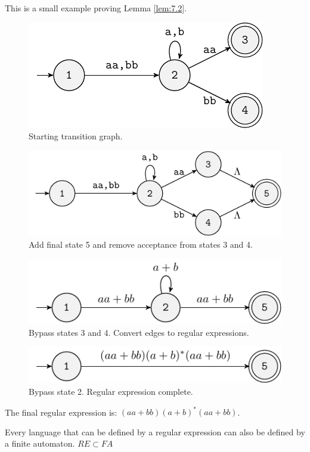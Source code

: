\newpage
\begin{example}
    This is a small example proving Lemma \ref{lem:7.2}.\\
    \begin{figure}[h!]
        \centering
        \includegraphics[width=0.5\linewidth]{lectures/figures/examples/7-1-1.pdf}
        \caption{Starting transition graph.}
    \end{figure}
    \begin{figure}[h!]
        \centering
        \includegraphics[width=0.6\linewidth]{lectures/figures/examples/7-1-2.pdf}
        \caption{Add final state 5 and remove acceptance from states 3 and 4.}
    \end{figure}
    \begin{figure}[h!]
        \centering
        \includegraphics[width=0.6\linewidth]{lectures/figures/examples/7-1-3.pdf}
        \caption{Bypass states 3 and 4. Convert edges to regular expressions.}
    \end{figure}
    \begin{figure}[h!]
        \centering
        \includegraphics[width=0.6\linewidth]{lectures/figures/examples/7-1-4.pdf}
        \caption{Bypass state 2. Regular expression complete.}
    \end{figure}
    The final regular expression is: \((aa+bb)(a+b)^*(aa+bb)\).
\end{example}
\begin{lemma}
    Every language that can be defined by a regular expression can also be defined by a finite automaton. \(RE \subset FA\)
\end{lemma}
